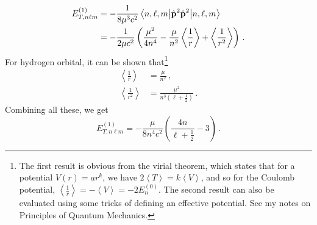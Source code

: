 \documentclass{article}
\theoremstyle{plain}\theoremheaderfont{\normalfont\itshape}\theorembodyfont{\rmfamily}\theoremseparator{.}\newtheorem*{rem}{Remark}\newtheorem*{ex}{Example}\newtheorem*{proof}{Proof}\newtheorem*{altp}{Alternative proof}
\theoremstyle{plain}\theoremheaderfont{\normalfont\bfseries}\theorembodyfont{\rmfamily}\theoremseparator{.}\newtheorem{thm}{Theorem}[section]\newtheorem{lem}[thm]{Lemma}\newtheorem{prop}[thm]{Proposition}\newtheorem*{cor}{Corollary}\newtheorem{defn}[thm]{Definition}\newtheorem{clm}[thm]{Claim}\newtheorem{clminproof}{Claim}
\theoremstyle{break}\theoremheaderfont{\normalfont\itshape}\theorembodyfont{\rmfamily}\theoremseparator{.\medskip}\newtheorem*{proofskip}{Proof}\newtheorem*{exs}{Examples}\newtheorem*{rems}{Remarks}
\theoremstyle{break}\theoremheaderfont{\normalfont\bfseries}\theorembodyfont{\rmfamily}\theoremseparator{.\medskip}\newtheorem{lemskip}[thm]{Lemma}\newtheorem{defnskip}[thm]{Definition}\newtheorem{propskip}[thm]{Proposition}\newtheorem{thmskip}[thm]{Theorem}
\numberwithin{equation}{section}
\newcommand{\eval}[1]{\left\langle #1 \right\rangle}
\newcommand{\expval}[2]{\left\langle #2 \middle| #1 \middle| #2 \right\rangle}
\newcommand{\vb}[1]{\bm{\mathrm{#1}}}
\begin{document}
    \begin{align}
        E_{T,n\ell m}^{(1)}&=-\frac{1}{8\mu^3 c^2}\expval{\hat{\vb{p}}^2\hat{\vb{p}}^2}{n,\ell,m}\notag\\
        &=-\frac{1}{2\mu c^2}\left(\frac{\mu^2}{4n^4}-\frac{\mu}{n^2}\eval{\frac{1}{r}}+\eval{\frac{1}{r^2}}\right)\,.
    \end{align}
    For hydrogen orbital, it can be shown that\footnote{The first result is obvious from the virial theorem, which states that for a potential \(V(r)=ar^k\), we have \(2\eval{T}=k\eval{V}\), and so for the Coulomb potential, \(\eval{\frac{1}{r}}=-\eval{V}=-2E_n^{(0)}\). The second result can also be evaluated using some tricks of defining an effective potential. See my notes on Principles of Quantum Mechanics.}
    \begin{align}
        \eval{\frac{1}{r}}&=\frac{\mu}{n^2}\,,\\
        \eval{\frac{1}{r^2}}&=\frac{\mu^2}{n^3\left(\ell+\frac{1}{2}\right)}\,.
    \end{align}
    Combining all these, we get
    \begin{equation}
        E_{T,n\ell m}^{(1)}=-\frac{\mu}{8n^4 c^2}\left(\frac{4n}{\ell+\frac{1}{2}}-3\right)\,.
    \end{equation}
\end{document}
